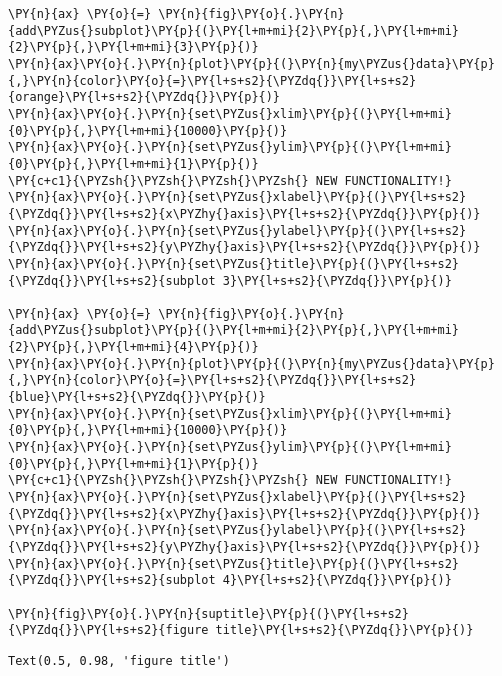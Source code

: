\begin{tcolorbox}[breakable, size=fbox, boxrule=1pt, pad at break*=1mm,colback=cellbackground, colframe=cellborder]
\begin{Verbatim}[commandchars=\\\{\}]
\PY{n}{ax} \PY{o}{=} \PY{n}{fig}\PY{o}{.}\PY{n}{add\PYZus{}subplot}\PY{p}{(}\PY{l+m+mi}{2}\PY{p}{,}\PY{l+m+mi}{2}\PY{p}{,}\PY{l+m+mi}{3}\PY{p}{)}
\PY{n}{ax}\PY{o}{.}\PY{n}{plot}\PY{p}{(}\PY{n}{my\PYZus{}data}\PY{p}{,}\PY{n}{color}\PY{o}{=}\PY{l+s+s2}{\PYZdq{}}\PY{l+s+s2}{orange}\PY{l+s+s2}{\PYZdq{}}\PY{p}{)}
\PY{n}{ax}\PY{o}{.}\PY{n}{set\PYZus{}xlim}\PY{p}{(}\PY{l+m+mi}{0}\PY{p}{,}\PY{l+m+mi}{10000}\PY{p}{)}
\PY{n}{ax}\PY{o}{.}\PY{n}{set\PYZus{}ylim}\PY{p}{(}\PY{l+m+mi}{0}\PY{p}{,}\PY{l+m+mi}{1}\PY{p}{)}
\PY{c+c1}{\PYZsh{}\PYZsh{}\PYZsh{}\PYZsh{} NEW FUNCTIONALITY!}
\PY{n}{ax}\PY{o}{.}\PY{n}{set\PYZus{}xlabel}\PY{p}{(}\PY{l+s+s2}{\PYZdq{}}\PY{l+s+s2}{x\PYZhy{}axis}\PY{l+s+s2}{\PYZdq{}}\PY{p}{)}
\PY{n}{ax}\PY{o}{.}\PY{n}{set\PYZus{}ylabel}\PY{p}{(}\PY{l+s+s2}{\PYZdq{}}\PY{l+s+s2}{y\PYZhy{}axis}\PY{l+s+s2}{\PYZdq{}}\PY{p}{)}
\PY{n}{ax}\PY{o}{.}\PY{n}{set\PYZus{}title}\PY{p}{(}\PY{l+s+s2}{\PYZdq{}}\PY{l+s+s2}{subplot 3}\PY{l+s+s2}{\PYZdq{}}\PY{p}{)}

\PY{n}{ax} \PY{o}{=} \PY{n}{fig}\PY{o}{.}\PY{n}{add\PYZus{}subplot}\PY{p}{(}\PY{l+m+mi}{2}\PY{p}{,}\PY{l+m+mi}{2}\PY{p}{,}\PY{l+m+mi}{4}\PY{p}{)}
\PY{n}{ax}\PY{o}{.}\PY{n}{plot}\PY{p}{(}\PY{n}{my\PYZus{}data}\PY{p}{,}\PY{n}{color}\PY{o}{=}\PY{l+s+s2}{\PYZdq{}}\PY{l+s+s2}{blue}\PY{l+s+s2}{\PYZdq{}}\PY{p}{)}
\PY{n}{ax}\PY{o}{.}\PY{n}{set\PYZus{}xlim}\PY{p}{(}\PY{l+m+mi}{0}\PY{p}{,}\PY{l+m+mi}{10000}\PY{p}{)}
\PY{n}{ax}\PY{o}{.}\PY{n}{set\PYZus{}ylim}\PY{p}{(}\PY{l+m+mi}{0}\PY{p}{,}\PY{l+m+mi}{1}\PY{p}{)}
\PY{c+c1}{\PYZsh{}\PYZsh{}\PYZsh{}\PYZsh{} NEW FUNCTIONALITY!}
\PY{n}{ax}\PY{o}{.}\PY{n}{set\PYZus{}xlabel}\PY{p}{(}\PY{l+s+s2}{\PYZdq{}}\PY{l+s+s2}{x\PYZhy{}axis}\PY{l+s+s2}{\PYZdq{}}\PY{p}{)}
\PY{n}{ax}\PY{o}{.}\PY{n}{set\PYZus{}ylabel}\PY{p}{(}\PY{l+s+s2}{\PYZdq{}}\PY{l+s+s2}{y\PYZhy{}axis}\PY{l+s+s2}{\PYZdq{}}\PY{p}{)}
\PY{n}{ax}\PY{o}{.}\PY{n}{set\PYZus{}title}\PY{p}{(}\PY{l+s+s2}{\PYZdq{}}\PY{l+s+s2}{subplot 4}\PY{l+s+s2}{\PYZdq{}}\PY{p}{)}

\PY{n}{fig}\PY{o}{.}\PY{n}{suptitle}\PY{p}{(}\PY{l+s+s2}{\PYZdq{}}\PY{l+s+s2}{figure title}\PY{l+s+s2}{\PYZdq{}}\PY{p}{)}
\end{Verbatim}
\end{tcolorbox}

            \begin{tcolorbox}[breakable, size=fbox, boxrule=.5pt, pad at break*=1mm, opacityfill=0]
\begin{Verbatim}[commandchars=\\\{\}]
Text(0.5, 0.98, 'figure title')
\end{Verbatim}
\end{tcolorbox}
        
